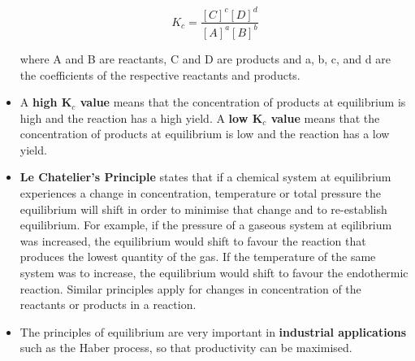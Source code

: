 \begin{itemize}
{\begin{equation*}
K_{c} = \frac{[C]^{c}[D]^{d}}{[A]^{a}[B]^{b}} 
\end{equation*}

where A and B are reactants, C and D are products and a, b, c, and d are the coefficients of the respective reactants and products. }
\item{A \textbf{high K$_{c}$ value} means that the concentration of products at equilibrium is high and the reaction has a high yield. A \textbf{low K$_{c}$ value} means that the concentration of products at equilibrium is low and the reaction has a low yield.}
\item{\textbf{Le Chatelier's Principle} states that if a chemical system at equilibrium experiences a change in concentration, temperature or total pressure the equilibrium will shift in order to minimise that change and to re-establish equilibrium. For example, if the pressure of a gaseous system at eqilibrium was increased, the equilibrium would shift to favour the reaction that produces the lowest quantity of the gas. If the temperature of the same system was to increase, the equilibrium would shift to favour the endothermic reaction. Similar principles apply for changes in concentration of the reactants or products in a reaction.}
\item{The principles of equilibrium are very important in \textbf{industrial applications} such as the Haber process, so that productivity can be maximised.}

\end{itemize}


